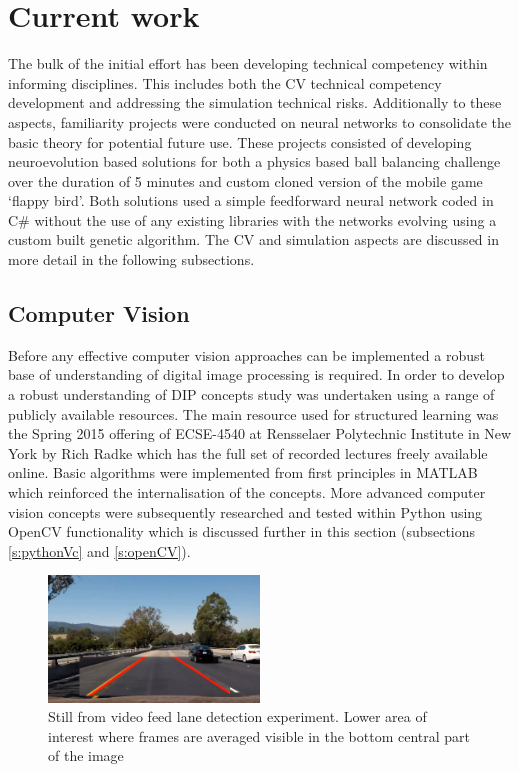 \documentclass[]{aiaa-tc}%
\begin{document}
\section{Current work}

The bulk of the initial effort has been developing technical competency within informing disciplines. This includes both the CV technical competency development and addressing the simulation technical risks. Additionally to these aspects, familiarity projects were conducted on neural networks to consolidate the basic theory for potential future use. These projects consisted of developing neuroevolution based solutions for both a physics based ball balancing challenge over the duration of 5 minutes and custom cloned version of the mobile game `flappy bird'. Both solutions used a simple feedforward neural network coded in C\# without the use of any existing libraries with the networks evolving using a custom built genetic algorithm. The CV and simulation aspects are discussed in more detail in the following subsections.

\subsection{Computer Vision}\label{s:currentWork_CV}

Before any effective computer vision approaches can be implemented a robust base of understanding of digital image processing is required. In order to develop a robust understanding of DIP concepts study was undertaken using a range of publicly available resources. The main resource used for structured learning was the Spring 2015 offering of ECSE-4540 at Rensselaer Polytechnic Institute in New York by Rich Radke which has the full set of recorded lectures freely available online. Basic algorithms were implemented from first principles in MATLAB which reinforced the internalisation of the concepts. More advanced computer vision concepts were subsequently researched and tested within Python using OpenCV functionality which is discussed further in this section (subsections \ref{s:pythonVc} and \ref{s:openCV}). 

\begin{figure} %
	\centering
	\includegraphics[width=0.5\textwidth, height=0.5\textwidth]{early_lane_detection_experiment.png}
	\caption{Still from video feed lane detection experiment. Lower area of interest where frames are averaged visible in the bottom central part of the image}
	\label{f:simpleLaneDetectionHough}
\end{figure}
\end{document}
